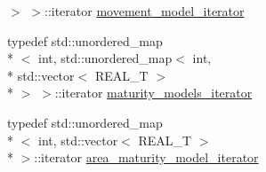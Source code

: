 \begin{DoxyCompactItemize}
 $>$ $>$\-::iterator \hyperlink{classmas_1_1_population_a7c0c3438d8b5c223cb3ca7072d5e84bc}{movement\-\_\-model\-\_\-iterator}
\item 
typedef std\-::unordered\-\_\-map\\*
$<$ int, std\-::unordered\-\_\-map$<$ int, \\*
std\-::vector$<$ R\-E\-A\-L\-\_\-\-T $>$\\*
 $>$ $>$\-::iterator \hyperlink{classmas_1_1_population_ac63fa975ca5b6070604a82240a0d297b}{maturity\-\_\-models\-\_\-iterator}
\item 
typedef std\-::unordered\-\_\-map\\*
$<$ int, std\-::vector$<$ R\-E\-A\-L\-\_\-\-T $>$\\*
 $>$\-::iterator \hyperlink{classmas_1_1_population_a6c5591e255cb99b132de23c5c2a6dbaa}{area\-\_\-maturity\-\_\-model\-\_\-iterator}
\end{DoxyCompactItemize}
